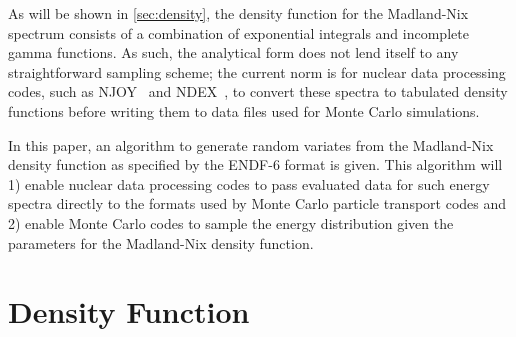 \documentclass[3p,fleqn]{elsarticle}
\begin{document}
As will be shown in \autoref{sec:density}, the density function for the
Madland-Nix spectrum consists of a combination of exponential integrals and
incomplete gamma functions. As such, the analytical form does not lend itself
to any straightforward sampling scheme; the current norm is for nuclear data
processing codes, such as NJOY~\cite{lanl-macfarlane-2012} and
NDEX~\cite{snamc-griesheimer-2013}, to convert these spectra to tabulated
density functions before writing them to data files used for Monte Carlo
simulations.

In this paper, an algorithm to generate random variates from the Madland-Nix
density function as specified by the ENDF-6 format is given. This algorithm
will 1) enable nuclear data processing codes to pass evaluated data for such
energy spectra directly to the formats used by Monte Carlo particle transport
codes and 2) enable Monte Carlo codes to sample the energy distribution given
the parameters for the Madland-Nix density function.

\section{Density Function}
\label{sec:density}
\end{document}
